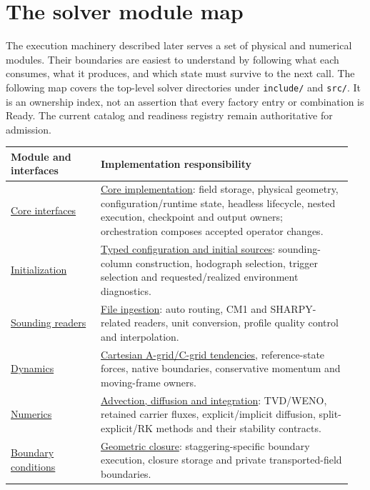 \section{The solver module map}
\label{architecture-solver-map}

The execution machinery described later serves a set of physical and numerical
modules. Their boundaries are easiest to understand by following what each
consumes, what it produces, and which state must survive to the next call.
The following map covers the top-level solver directories under
\texttt{include/} and \texttt{src/}. It is an ownership index, not an assertion
that every factory entry or combination is Ready. The current catalog and
readiness registry remain authoritative for admission.

\begin{longtable}{@{}p{0.25\linewidth}p{0.70\linewidth}@{}}
\toprule
Module and interfaces & Implementation responsibility \\
\midrule
\endhead
\bottomrule
\endfoot
\href{../include/core}{Core interfaces} &
\href{../src/core}{Core implementation}: field storage, physical geometry,
configuration/runtime state, headless lifecycle, nested execution, checkpoint
and output owners; orchestration composes accepted operator changes. \\
\href{../include/init}{Initialization} &
\href{../src/init}{Typed configuration and initial sources}: sounding-column
construction, hodograph selection, trigger selection and requested/realized
environment diagnostics. \\
\href{../include/soundings}{Sounding readers} &
\href{../src/soundings}{File ingestion}: auto routing, CM1 and SHARPY-related
readers, unit conversion, profile quality control and interpolation. \\
\href{../include/dynamics}{Dynamics} &
\href{../src/dynamics}{Cartesian A-grid/C-grid tendencies}, reference-state
forces, native boundaries, conservative momentum and moving-frame owners. \\
\href{../include/numerics}{Numerics} &
\href{../src/numerics}{Advection, diffusion and integration}: TVD/WENO,
retained carrier fluxes, explicit/implicit diffusion, split-explicit/RK methods
and their stability contracts. \\
\href{../include/boundary_conditions}{Boundary conditions} &
\href{../src/boundary_conditions}{Geometric closure}: staggering-specific
boundary execution, closure storage and private transported-field boundaries. \\

\end{longtable}
